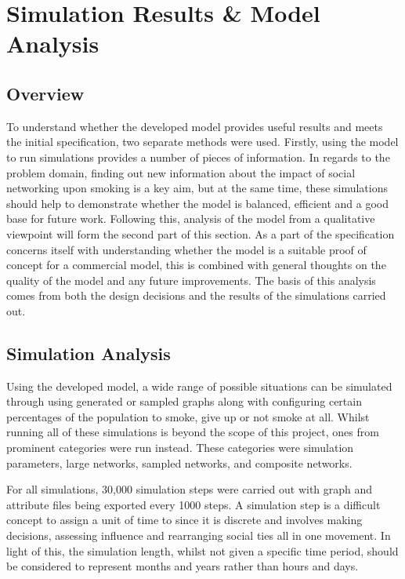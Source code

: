 \documentclass[]{report}
\begin{document}
%
%

%
%
\chapter{Simulation Results \& Model Analysis}
\section{Overview}

To understand whether the developed model provides useful results and meets the initial specification, two separate methods were used. Firstly, using the model to run simulations provides a number of pieces of information. In regards to the problem domain, finding out new information about the impact of social networking upon smoking is a key aim, but at the same time, these simulations should help to demonstrate whether the model is balanced, efficient and a good base for future work. Following this, analysis of the model from a qualitative viewpoint will form the second part of this section. As a part of the specification concerns itself with understanding whether the model is a suitable proof of concept for a commercial model, this is combined with general thoughts on the quality of the model and any future improvements. The basis of this analysis comes from both the design decisions and the results of the simulations carried out.

\section{Simulation Analysis}
Using the developed model, a wide range of possible situations can be simulated through using generated or sampled graphs along with configuring certain percentages of the population to smoke, give up or not smoke at all. Whilst running all of these simulations is beyond the scope of this project, ones from prominent categories were run instead. These categories were simulation parameters, large networks, sampled networks, and composite networks.

For all simulations, 30,000 simulation steps were carried out with graph and attribute files being exported every 1000 steps. A simulation step is a difficult concept to assign a unit of time to since it is discrete and involves making decisions, assessing influence and rearranging social ties all in one movement. In light of this, the simulation length, whilst not given a specific time period, should be considered to represent months and years rather than hours and days.
\end{document}

